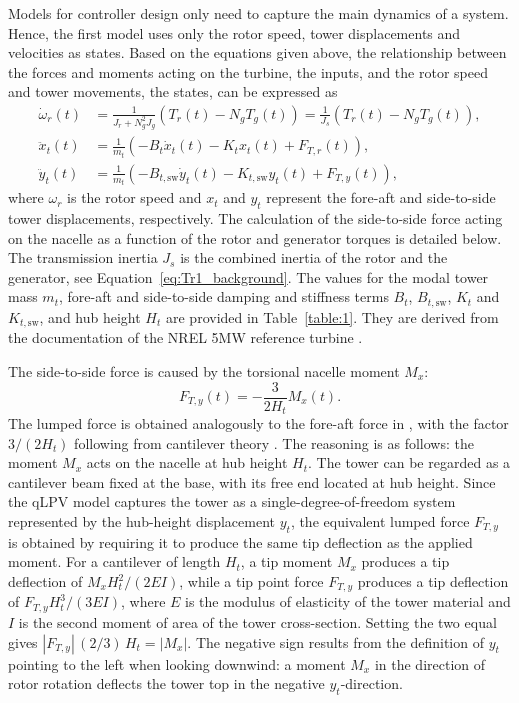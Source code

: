 Models for controller design only need to capture the main dynamics of a system. Hence, the first model uses only the rotor speed, tower displacements and velocities as states. Based on the equations given above, the relationship between the forces and moments acting on the turbine, the inputs, and the rotor speed and tower movements, the states, can be expressed as
\begin{equation}\label{eq:Mdl1NonLin}
    \begin{split} 
        \dot{\omega}_r(t) &= \frac{1}{J_r + N_g^2 J_g}(T_r(t) - N_{g}T_{g}(t)) = \frac{1}{J_s}(T_r(t) - N_{g}T_{g}(t)),   \\
        \ddot{x}_{t}(t) & = \frac{1}{m_{t}}(-B_{t}\dot{x}_{t}(t) - K_{t}{x}_{t}(t) + F_{T,r}(t)), \\
        \ddot{y}_{t}(t) &= \frac{1}{m_{t}}(-B_{t,\text{sw}} \dot{y}_{t}(t) - K_{t,\text{sw}}{y}_{t}(t) + F_{T,y}(t)),       
    \end{split}
\end{equation}
where $\omega_r$ is the rotor speed and $x_t$ and $y_t$ represent the fore-aft and side-to-side tower displacements, respectively. The calculation of the side-to-side force acting on the nacelle as a function of the rotor and generator torques is detailed below. The transmission inertia $J_s$ is the combined inertia of the rotor and the generator, see Equation~\eqref{eq:Tr1_background}. The values for the modal tower mass $m_{t}$, fore-aft and side-to-side damping and stiffness terms $B_t$, $B_{t,\text{sw}}$, $K_t$ and $K_{t,\text{sw}}$, and hub height $H_t$ are provided in Table~\ref{table:1}. They are derived from the documentation of the NREL 5MW reference turbine \cite{jonkman2009definition}.

The side-to-side force is caused by the torsional nacelle moment $M_x$:
\begin{equation}
    F_{T,y}(t) = -\frac{3}{2H_t}M_x(t).
\end{equation}
The lumped force is obtained analogously to the fore-aft force in \cite{Bianchi2007}, with the factor $3/(2H_t)$ following from cantilever theory \cite{selvam2009feedback}. The reasoning is as follows: the moment $M_x$ acts on the nacelle at hub height $H_t$. The tower can be regarded as a cantilever beam fixed at the base, with its free end located at hub height. Since the qLPV model captures the tower as a single-degree-of-freedom system represented by the hub-height displacement $y_t$, the equivalent lumped force $F_{T,y}$ is obtained by requiring it to produce the same tip deflection as the applied moment. For a cantilever of length $H_t$, a tip moment $M_x$ produces a tip deflection of $M_x H_t^2/(2EI)$, while a tip point force $F_{T,y}$ produces a tip deflection of $F_{T,y} H_t^3/(3EI)$, where $E$ is the modulus of elasticity of the tower material and $I$ is the second moment of area of the tower cross-section. Setting the two equal gives $|F_{T,y}|\,(2/3)\,H_t = |M_x|$. The negative sign results from the definition of $y_t$ pointing to the left when looking downwind: a moment $M_x$ in the direction of rotor rotation deflects the tower top in the negative $y_t$-direction.

